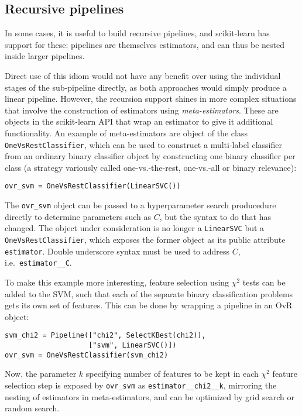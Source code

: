 \documentclass[a4paper,twocolumn]{article}
\begin{document}
\subsection{Recursive pipelines}

In some cases, it is useful to build recursive pipelines,
and scikit-learn has support for these:
pipelines are themselves estimators,
and can thus be nested inside larger pipelines.

Direct use of this idiom would not have any benefit
over using the individual stages of the sub-pipeline directly,
as both approaches would simply produce a linear pipeline.
However, the recursion support shines in more complex situations
that involve the construction of estimators using \textit{meta-estimators}.
These are objects in the scikit-learn API
that wrap an estimator to give it additional functionality.
An example of meta-estimators are object of the class
\texttt{OneVsRestClassifier},
which can be used to construct a multi-label classifier
\citep{tsoumakas2007multi}
from an ordinary binary classifier object
by constructing one binary classifier per class
(a strategy variously called one-vs.-the-rest,
one-vs.-all or binary relevance):

\begin{verbatim}
ovr_svm = OneVsRestClassifier(LinearSVC())
\end{verbatim}

The \texttt{ovr\_svm} object can be passed to a hyperparameter search
producedure directly to determine parameters such as $C$,
but the syntax to do that has changed.
The object under consideration is no longer a \texttt{LinearSVC}
but a \texttt{OneVsRestClassifier},
which exposes the former object as its public attribute \texttt{estimator}.
Double underscore syntax must be used to address $C$,
i.e.\ \texttt{estimator\_\_C}.

To make this example more interesting,
feature selection using $\chi^2$ tests can be added to the SVM,
such that each of the separate binary classification problems
gets its own set of features.
This can be done by wrapping a pipeline in an OvR object:

\begin{verbatim}
svm_chi2 = Pipeline(["chi2", SelectKBest(chi2)],
                    ["svm", LinearSVC()])
ovr_svm = OneVsRestClassifier(svm_chi2)
\end{verbatim}

Now, the parameter $k$ specifying number of features to be kept
in each $\chi^2$ feature selection step
is exposed by \texttt{ovr\_svm} as \texttt{estimator\_\_chi2\_\_k},
mirroring the nesting of estimators in meta-estimators,
and can be optimized by grid search or random search.
\end{document}
